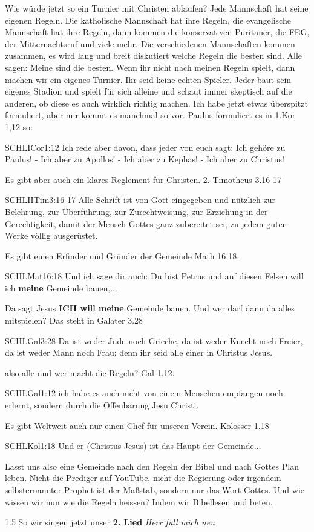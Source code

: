 \begin{spacing}{1.5}
Wie würde jetzt so ein Turnier mit Christen ablaufen? Jede Mannschaft hat seine eigenen Regeln. Die katholische Mannschaft hat ihre Regeln, die evangelische Mannschaft hat ihre Regeln, dann kommen die konservativen Puritaner, die FEG, der Mitternachtsruf und viele mehr. Die verschiedenen Mannschaften kommen zusammen, es wird lang und breit diskutiert welche Regeln die besten sind. Alle sagen: \glqq Meine sind die besten. Wenn ihr nicht nach meinen Regeln spielt, dann machen wir ein eigenes Turnier. Ihr seid keine echten Spieler.\grqq{} Jeder baut sein eigenes Stadion und spielt für sich alleine und schaut immer skeptisch auf die anderen, ob diese es auch wirklich richtig machen.
Ich habe jetzt etwas überspitzt formuliert, aber mir kommt es manchmal so vor.
Paulus formuliert es in 1.Kor 1,12 so: 
\begin{bibelbox}{SCHL}{ICor}{1:12}
Ich rede aber davon, dass jeder von euch sagt: Ich gehöre zu Paulus! - Ich aber zu Apollos! - Ich aber zu Kephas! - Ich aber zu Christus!
\end{bibelbox}
Es gibt aber auch ein klares Reglement für Christen. 2. Timotheus 3.16-17
\begin{bibelbox}{SCHL}{IITim}{3:16-17}
Alle Schrift ist von Gott eingegeben und nützlich zur Belehrung, zur Überführung, zur Zurechtweisung, zur Erziehung in der Gerechtigkeit, damit der Mensch Gottes ganz zubereitet sei, zu jedem guten Werke völlig ausgerüstet.
\end{bibelbox}
Es gibt einen Erfinder und Gründer der Gemeinde Math 16.18. 
\begin{bibelbox}{SCHL}{Mat}{16:18}
Und ich sage dir auch: Du bist Petrus und auf diesen Felsen will ich \textbf{meine} Gemeinde bauen,...
\end{bibelbox}
Da sagt Jesus \textbf{ICH will meine} Gemeinde bauen.
Und wer darf dann da alles mitspielen? Das steht in  Galater 3.28
\begin{bibelbox}{SCHL}{Gal}{3:28}
Da ist weder Jude noch Grieche, da ist weder Knecht noch Freier, da ist weder Mann noch Frau; denn ihr seid alle einer in Christus Jesus.
\end{bibelbox}
also alle und wer macht die Regeln? Gal 1.12.
\begin{bibelbox}{SCHL}{Gal}{1:12}
ich habe es auch nicht von einem Menschen empfangen noch erlernt, sondern durch die Offenbarung Jesu Christi.
\end{bibelbox}
Es gibt Weltweit auch nur einen Chef für unseren Verein. Kolosser 1.18
\begin{bibelbox}{SCHL}{Kol}{1:18}
Und er (Christus Jesus) ist das Haupt der Gemeinde...
\end{bibelbox}
Lasst uns also eine Gemeinde nach den Regeln der Bibel und nach Gottes Plan leben. 
Nicht die Prediger auf YouTube, nicht die Regierung oder irgendein selbsternannter Prophet ist der Maßstab, sondern nur das Wort Gottes. Und wie wissen wir nun wie die Regeln heissen? Indem wir Bibellesen und beten. 
\end{spacing}{1.5}
So wir singen jetzt unser \textbf{2. Lied} \textit{Herr füll mich neu}

